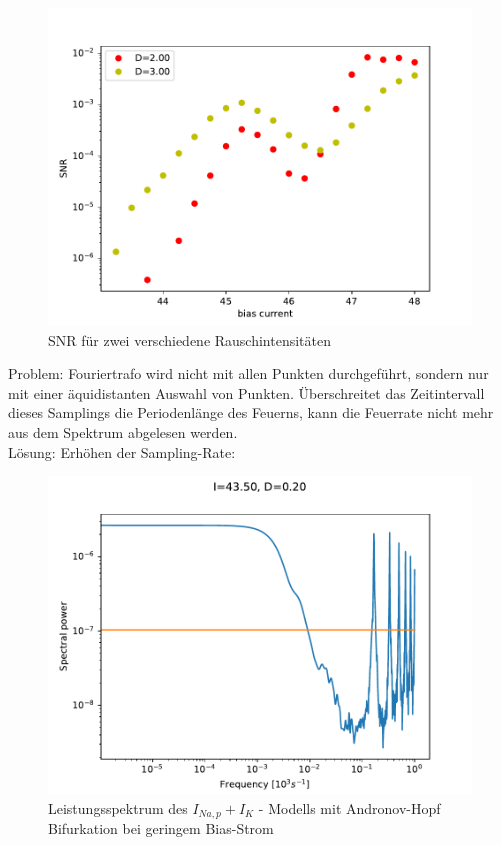 \documentclass[12pt,a4paper]{article}
\begin{document}
\begin{figure}[H]
	\centering
	\includegraphics[scale=1]{snranhopf27jws.pdf}\caption{SNR für zwei verschiedene Rauschintensitäten}
	\label{snranhopf}
\end{figure}
Problem: Fouriertrafo wird nicht mit allen Punkten durchgeführt, sondern nur mit einer äquidistanten Auswahl von Punkten. Überschreitet das Zeitintervall dieses Samplings die Periodenlänge des Feuerns, kann die Feuerrate nicht mehr aus dem Spektrum abgelesen werden.
\\
Lösung: Erhöhen der Sampling-Rate:
\begin{figure}[H]
	\centering
	\includegraphics[scale=1]{spanhopfd20ismallwlim.pdf}\caption{Leistungsspektrum des $I_{Na,p}+I_K$ - Modells mit Andronov-Hopf Bifurkation bei geringem Bias-Strom}
	\label{spanhopfismall}
\end{figure}
\end{document}
